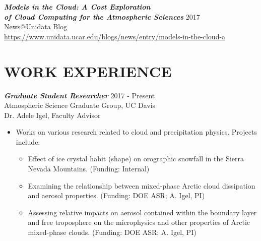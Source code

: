 \documentclass[overlapped]{res}
\begin{document}
\begin{resume}


    
    {\sl \textbf{Models in the Cloud: A Cost Exploration \\ of Cloud Computing for the Atmospheric Sciences}} \hfill 2017 \\
    News@Unidata Blog \\
    \href{https://www.unidata.ucar.edu/blogs/news/entry/models-in-the-cloud-a}{https://www.unidata.ucar.edu/blogs/news/entry/models-in-the-cloud-a}
    
    
\newpage
\section{WORK EXPERIENCE} 


                {\sl \textbf{Graduate Student Researcher}} \hfill 2017 - Present \\
                Atmospheric Science Graduate Group, UC Davis \\
                Dr. Adele Igel, Faculty Advisor \\
                \begin{itemize}
                    \item Works on various research related to cloud and precipitation physics. Projects include:
                    \begin{itemize} \itemsep -2pt
                        \item Effect of ice crystal habit (shape) on orographic snowfall in the Sierra Nevada Mountains. (Funding: Internal)
                        \item Examining the relationship between mixed-phase Arctic cloud dissipation and aerosol properties. (Funding: DOE ASR; A. Igel, PI) 
                        \item Assessing relative impacts on aerosol contained within the boundary layer and free troposphere on the microphysics and other properties of Arctic mixed-phase clouds. (Funding: DOE ASR; A. Igel, PI)
                    \end{itemize}
                \end{itemize}


\end{resume}
\end{document}
